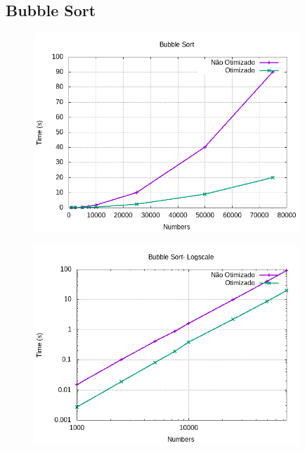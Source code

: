 \documentclass[a4paper, 12pt]{article}
\begin{document}
\subsection{Bubble Sort}
\begin{figure}[H]
	\centering
	\includegraphics[width=10.0cm]{bubble.png}
\end{figure}



\begin{figure}[H]
	\centering
	\includegraphics[width=10.0cm]{bubble_log.png}
\end{figure}
\end{document}
